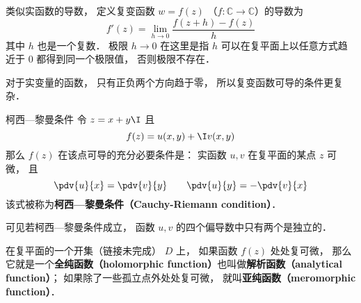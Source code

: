 
\begin{issues}
\issueTODO
\end{issues}


\begin{definition}{}
类似实函数的导数， 定义复变函数 $w = f(z)$ （$f:\mathbb C\to \mathbb C$）的导数为
\begin{equation}\label{CauRie_eq4}
f'(z) = \lim_{h\to 0} \frac{f(z + h) - f(z)}{h}
\end{equation}
其中 $h$ 也是一个复数． 极限 $h \to 0$ 在这里是指 $h$ 可以在复平面上以任意方式趋近于 $0$ 都得到同一个极限值， 否则极限不存在．
\end{definition}

对于实变量的函数， 只有正负两个方向趋于零， 所以复变函数可导的条件更复杂．

\begin{theorem}{柯西—黎曼条件}
令 $z = x + y\I$ 且
\begin{equation}
f(z) = u(x, y) + \I v(x, y)
\end{equation}
那么 $f(z)$ 在该点可导的充分必要条件是： 实函数 $u,v$ 在复平面的某点 $z$ 可微， 且
\begin{equation}\label{CauRie_eq1}
\pdv{u}{x} = \pdv{v}{y} \qquad
\pdv{u}{y} = - \pdv{v}{x}
\end{equation}
该式被称为\textbf{柯西—黎曼条件（Cauchy-Riemann condition）}．
\end{theorem}
可见若柯西—黎曼条件成立， 函数 $u,v$ 的四个偏导数中只有两个是独立的．

在复平面的一个开集（链接未完成） $D$ 上， 如果函数 $f(z)$ 处处复可微， 那么它就是一个\textbf{全纯函数（holomorphic function）}也叫做\textbf{解析函数（analytical function）}； 如果除了一些孤立点外处处复可微， 就叫\textbf{亚纯函数（meromorphic function）}．

